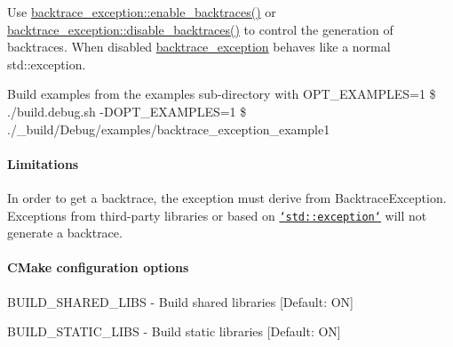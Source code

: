 \begin{DoxyItemize}
\item Use {\ttfamily \hyperlink{namespacebacktrace__exception_a4e1b86dea1b116c7bac88d89448a808e}{backtrace\-\_\-exception\-::enable\-\_\-backtraces()}} or {\ttfamily \hyperlink{namespacebacktrace__exception_a134895cbad5bc441a941f1f49b43a78a}{backtrace\-\_\-exception\-::disable\-\_\-backtraces()}} to control the generation of backtraces. When disabled \hyperlink{namespacebacktrace__exception}{backtrace\-\_\-exception} behaves like a normal {\ttfamily std\-::exception}.
\item Build examples from the examples sub-\/directory with {\ttfamily O\-P\-T\-\_\-\-E\-X\-A\-M\-P\-L\-E\-S=1} \$ ./build.debug.\-sh -\/\-D\-O\-P\-T\-\_\-\-E\-X\-A\-M\-P\-L\-E\-S=1 \$ ./\-\_\-build/\-Debug/examples/backtrace\-\_\-exception\-\_\-example1
\end{DoxyItemize}

\paragraph*{Limitations}


\begin{DoxyItemize}
\item In order to get a backtrace, the exception must derive from {\ttfamily Backtrace\-Exception}. Exceptions from third-\/party libraries or based on \href{https://en.cppreference.com/w/cpp/error/exception}{\tt `std\-::exception`} will not generate a backtrace.
\end{DoxyItemize}

\paragraph*{C\-Make configuration options}


\begin{DoxyItemize}
\item {\ttfamily B\-U\-I\-L\-D\-\_\-\-S\-H\-A\-R\-E\-D\-\_\-\-L\-I\-B\-S} -\/ Build shared libraries \mbox{[}Default\-: O\-N\mbox{]}
\item {\ttfamily B\-U\-I\-L\-D\-\_\-\-S\-T\-A\-T\-I\-C\-\_\-\-L\-I\-B\-S} -\/ Build static libraries \mbox{[}Default\-: O\-N\mbox{]} 
\end{DoxyItemize}